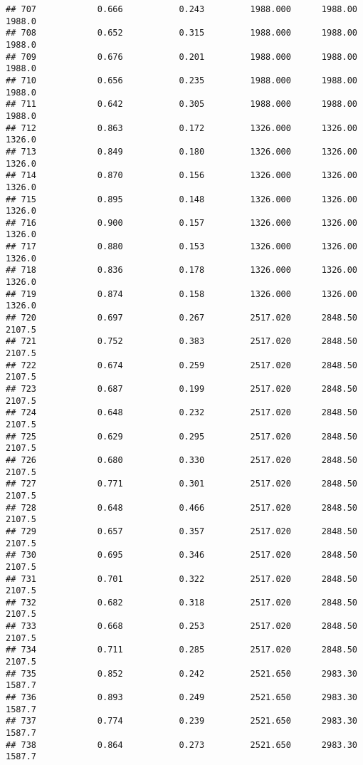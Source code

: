 \documentclass[
]{article}
\begin{document}
\begin{verbatim}
## 707            0.666           0.243         1988.000      1988.00       1988.0
## 708            0.652           0.315         1988.000      1988.00       1988.0
## 709            0.676           0.201         1988.000      1988.00       1988.0
## 710            0.656           0.235         1988.000      1988.00       1988.0
## 711            0.642           0.305         1988.000      1988.00       1988.0
## 712            0.863           0.172         1326.000      1326.00       1326.0
## 713            0.849           0.180         1326.000      1326.00       1326.0
## 714            0.870           0.156         1326.000      1326.00       1326.0
## 715            0.895           0.148         1326.000      1326.00       1326.0
## 716            0.900           0.157         1326.000      1326.00       1326.0
## 717            0.880           0.153         1326.000      1326.00       1326.0
## 718            0.836           0.178         1326.000      1326.00       1326.0
## 719            0.874           0.158         1326.000      1326.00       1326.0
## 720            0.697           0.267         2517.020      2848.50       2107.5
## 721            0.752           0.383         2517.020      2848.50       2107.5
## 722            0.674           0.259         2517.020      2848.50       2107.5
## 723            0.687           0.199         2517.020      2848.50       2107.5
## 724            0.648           0.232         2517.020      2848.50       2107.5
## 725            0.629           0.295         2517.020      2848.50       2107.5
## 726            0.680           0.330         2517.020      2848.50       2107.5
## 727            0.771           0.301         2517.020      2848.50       2107.5
## 728            0.648           0.466         2517.020      2848.50       2107.5
## 729            0.657           0.357         2517.020      2848.50       2107.5
## 730            0.695           0.346         2517.020      2848.50       2107.5
## 731            0.701           0.322         2517.020      2848.50       2107.5
## 732            0.682           0.318         2517.020      2848.50       2107.5
## 733            0.668           0.253         2517.020      2848.50       2107.5
## 734            0.711           0.285         2517.020      2848.50       2107.5
## 735            0.852           0.242         2521.650      2983.30       1587.7
## 736            0.893           0.249         2521.650      2983.30       1587.7
## 737            0.774           0.239         2521.650      2983.30       1587.7
## 738            0.864           0.273         2521.650      2983.30       1587.7

\end{verbatim}
\end{document}
